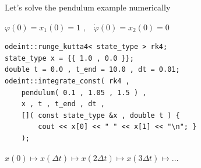 \begin{frame}[fragile]
 \centerline{ \Large Let's solve the pendulum example numerically}

\vspace{2ex}
$\varphi(0) = x_1(0) = 1 \,\, \text{,} \quad \dot{\varphi}(0) = x_2(0) = 0$
\vspace{2ex}

\begin{lstlisting}
odeint::runge_kutta4< state_type > rk4;
state_type x = {{ 1.0 , 0.0 }};
double t = 0.0 , t_end = 10.0 , dt = 0.01;
odeint::integrate_const( rk4 ,
    pendulum( 0.1 , 1.05 , 1.5 ) ,
    x , t , t_end , dt ,
    []( const state_type &x , double t ) {
        cout << x[0] << " " << x[1] << "\n"; }
    );
\end{lstlisting}

\vspace{2ex}

\centerline{$x(0) \mapsto x(\Delta t) \mapsto x(2\Delta t) \mapsto x(3\Delta t) \mapsto \dots$}

\end{frame}




